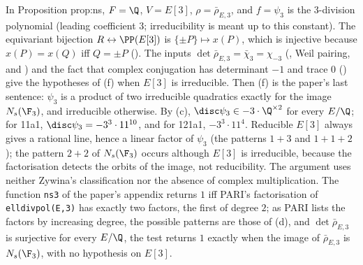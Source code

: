 \begin{paperlink}
In Proposition prop:ns, $F=\Q$, $V=E[3]$, $\rho=\bar\rho_{E,3}$, and $f=\psi_3$ is the $3$-division polynomial (leading coefficient $3$; irreducibility is meant up to
this constant). The equivariant bijection $R\leftrightarrow\PP(E[3])$ is $\{\pm P\}\mapsto x(P)$, which is injective because $x(P)=x(Q)$ iff $Q=\pm P$
(). The inputs $\det\bar\rho_{E,3}=\bar\chi_3=\chi_{-3}$ (, Weil pairing, and ) and the fact that complex
conjugation has determinant $-1$ and trace $0$ () give the hypotheses of (f) when $E[3]$ is irreducible. Then (f) is the
paper's last sentence: $\psi_3$ is a product of two irreducible quadratics exactly for the image $N_s(\F_3)$, and irreducible otherwise. By (c),
$\disc\psi_3\in-3\cdot\Q^{\times2}$ for every $E/\Q$; for 11a1, $\disc\psi_3=-3^3\cdot11^{10}$, and for 121a1, $-3^3\cdot11^4$. Reducible $E[3]$ always gives a
rational line, hence a linear factor of $\psi_3$ (the patterns $1+3$ and $1+1+2$); the pattern $2+2$ of $N_s(\F_3)$ occurs although $E[3]$ is irreducible, because the
factorisation detects the orbits of the image, not reducibility. The argument uses neither Zywina's classification nor the absence of complex multiplication.
The function \texttt{ns3} of the paper's appendix returns $1$ iff PARI's factorisation of \texttt{elldivpol(E,3)} has exactly two factors, the first of degree $2$;
as PARI lists the factors by increasing degree, the possible patterns are those of (d), and $\det\bar\rho_{E,3}$ is surjective for every $E/\Q$, the test
returns $1$ exactly when the image of $\bar\rho_{E,3}$ is $N_s(\F_3)$, with no hypothesis on $E[3]$.
\end{paperlink}

